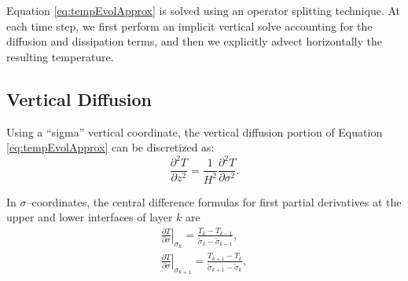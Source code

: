 Equation \ref{eq:tempEvolApprox} is solved using an operator splitting technique. At each time step, we first perform an implicit vertical solve accounting for the diffusion and dissipation terms, and then we explicitly advect horizontally the resulting temperature. 

\subsection{Vertical Diffusion}
\label{sec:TvertDiff}

Using a ``sigma'' vertical coordinate, the vertical diffusion portion of Equation \ref{eq:tempEvolApprox} can be discretized as:
\begin{equation}
  \frac{{{\partial }^{2}}T}{\partial {{z}^{2}}}=\frac{1}{{{H}^{2}}}\frac{{{\partial }^{2}}T}{\partial {{\sigma }^{2}}}.
\end{equation}

In $\sigma$--coordinates, the central difference formulas for first partial derivatives at the upper and lower interfaces of layer $k$ are
\begin{equation}
  \label{eq:vertDiffFirstDeriv}
  \begin{split}
    {{\left. \frac{\partial T}{\partial \sigma } \right|}_{{{\sigma }_{k}}}} =
    \frac{{{T}_{k}}-{{T}_{k-1}}}{{{{\tilde{\sigma }}}_{k}}-{{{\tilde{\sigma }}}_{k-1}}},\\
    {{\left. \frac{\partial T}{\partial \sigma } \right|}_{{{\sigma }_{k+1}}}} =
    \frac{{{T}_{k+1}}-{{T}_{k}}}{{{{\tilde{\sigma }}}_{k+1}}-{{{\tilde{\sigma }}}_{k}}},
  \end{split}
\end{equation}

